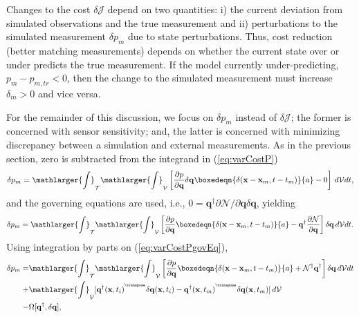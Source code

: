 Changes to the cost $\delta \mathcal{J}$ depend on two quantities: i) the current deviation from simulated observations and the true measurement and ii) perturbations to the simulated measurement $\delta p_m$ due to state perturbations. Thus, cost reduction (better matching measurements) depends on whether the current state over or under predicts the true measurement. If the model currently under-predicting, $p_m-p_{m,tr}<0$, then the change to the simulated measurement must increase $\delta_m > 0$ and vice versa. 

For the remainder of this discussion,  {we focus on} $\delta p_m$ {instead of} $\delta \mathcal{J}${; the former is concerned with sensor sensitivity; and, the latter is concerned with minimizing discrepancy between a simulation and external measurements}.  As in the previous section, zero is subtracted from the integrand in (\ref{eq:varCostP})
\begin{equation}
\delta p_m= \mathlarger{\int}_{\mathcal{T}} \mathlarger{\int}_{\mathcal{V}} \left[\frac{\partial p}{\partial \mathbf{q}}\delta{\mathbf{q}} \boxedeqn{\delta(\mathbf{x}-\mathbf{x}_m,t-t_m)}{a}-0\right]\,d\mathcal{V} dt,
\end{equation}
and the governing equations are used, i.e., $0=\mathbf{q}^\dagger \partial \mathcal{N}/\partial \mathbf{q} \delta \mathbf{q}$, yielding
\begin{equation}\label{eq:varCostPgovEq}
\delta p_m= \mathlarger{\int}_{\mathcal{T}} \mathlarger{\int}_{\mathcal{V}} \left[\frac{\partial p}{\partial \mathbf{q}} \boxedeqn{\delta(\mathbf{x}-\mathbf{x}_m,t-t_m)}{a}-\mathbf{q}^\dagger \frac{\partial \mathcal{N}}{\partial \mathbf{q}} \right]\delta{\mathbf{q}}\,d\mathcal{V} dt.
\end{equation}
Using integration by parts on (\ref{eq:varCostPgovEq}),
\begin{align}\label{eq:varCostPgovEqIBP}
\delta p_m=& \mathlarger{\int}_{\mathcal{T}} \mathlarger{\int}_{\mathcal{V}} \left[\frac{\partial p}{\partial \mathbf{q}} \boxedeqn{\delta(\mathbf{x}-\mathbf{x}_m,t-t_m)}{a}+\mathcal{N}^\dagger \mathbf{q}^\dagger \right]\delta{\mathbf{q}}\,d\mathcal{V} dt\\\nonumber
+& \mathlarger{\int}_{\mathcal{V}} [\mathbf{q}^\dagger(\mathbf{x},t_i)^{^\transpose} \delta{\mathbf{q}}(\mathbf{x},t_i)-\mathbf{q}^\dagger(\mathbf{x},t_m)^{^\transpose} \delta{\mathbf{q}}(\mathbf{x},t_m)]\,d\mathcal{V}\\\nonumber
-&\Omega[\mathbf{q}^\dagger,\delta \mathbf{q}],
\end{align}
